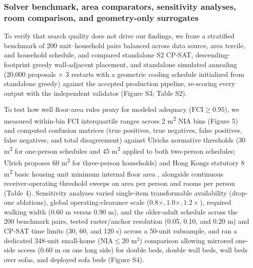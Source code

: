 \documentclass[12pt,letterpaper]{article}
\newcommand{\SubmissionCite}[1]{\unskip\citep{#1}}
\begin{document}
\subsubsection{Solver benchmark, area comparators, sensitivity analyses, room comparison, and geometry-only surrogates}\label{solver-benchmark-area-comparators-sensitivity-analyses-room-comparison-and-geometry-only-surrogates}

To verify that search quality does not drive our findings, we froze a stratified benchmark of 200 unit--household pairs balanced across data source, area tercile, and household schedule, and compared standalone S2 CP-SAT, descending-footprint greedy wall-adjacent placement, and standalone simulated annealing (20,000 proposals \(\times\) 3 restarts with a geometric cooling schedule initialized from standalone greedy) against the accepted production pipeline, re-scoring every output with the independent validator (Figure S3; Table S2).

To test how well floor-area rules proxy for modeled adequacy (\(\text{FCI} \ge 0.95\)), we measured within-bin FCI interquartile ranges across 2 m\textsuperscript{2} NIA bins (Figure 5) and computed confusion matrices (true positives, true negatives, false positives, false negatives, and total disagreement) against Ulrich\textquotesingle s \SubmissionCite{ulrich2025minimum} normative thresholds (30 m\textsuperscript{2} for one-person schedules and 45 m\textsuperscript{2} applied to both two-person schedules; Ulrich proposes 60 m\textsuperscript{2} for three-person households) and Hong Kong\textquotesingle s statutory 8 m\textsuperscript{2} basic housing unit minimum internal floor area \SubmissionCite{hksar2025basic}, alongside continuous receiver-operating threshold sweeps on area per person and rooms per person (Table 4). Sensitivity analyses varied single-item transformable availability (drop-one ablations), global operating-clearance scale (\(0.8\times, 1.0\times, 1.2\times\)), required walking width (0.60 m versus 0.90 m), and the older-adult schedule across the 200 benchmark pairs, tested raster/anchor resolution (0.05, 0.10, and 0.20 m) and CP-SAT time limits (30, 60, and 120 s) across a 50-unit subsample, and ran a dedicated 348-unit small-home (\(\text{NIA} \le 20\text{ m}^2\)) comparison allowing mirrored one-side access (\(0.60\text{ m}\) on one long side) for double beds, double wall beds, wall beds over sofas, and deployed sofa beds (Figure S4).
\end{document}
